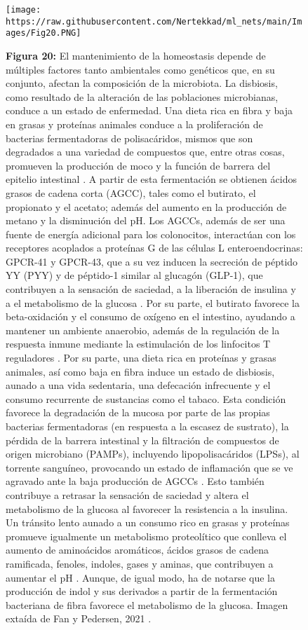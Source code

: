 \documentclass[
]{book}
\begin{document}
\begin{figure}
\centering
\texttt{[image: https://raw.githubusercontent.com/Nertekkad/ml\_nets/main/Images/Fig20.PNG]}
\caption{\textbf{Figura 20:} El mantenimiento de la homeostasis depende de múltiples factores tanto ambientales como genéticos que, en su conjunto, afectan la composición de la microbiota. La disbiosis, como resultado de la alteración de las poblaciones microbianas, conduce a un estado de enfermedad. Una dieta rica en fibra y baja en grasas y proteínas animales conduce a la proliferación de bacterias fermentadoras de polisacáridos, mismos que son degradados a una variedad de compuestos que, entre otras cosas, promueven la producción de moco y la función de barrera del epitelio intestinal \citep{fan2021gut}. A partir de esta fermentación se obtienen ácidos grasos de cadena corta (AGCC), tales como el butirato, el propionato y el acetato; además del aumento en la producción de metano y la disminución del pH. Los AGCCs, además de ser una fuente de energía adicional para los colonocitos, interactúan con los receptores acoplados a proteínas G de las células L enteroendocrinas: GPCR-41 y GPCR-43, que a su vez inducen la secreción de péptido YY (PYY) y de péptido-1 similar al glucagón (GLP-1), que contribuyen a la sensación de saciedad, a la liberación de insulina y a el metabolismo de la glucosa \citep{flint2000effect}. Por su parte, el butirato favorece la beta-oxidación y el consumo de oxígeno en el intestino, ayudando a mantener un ambiente anaerobio, además de la regulación de la respuesta inmune mediante la estimulación de los linfocitos T reguladores \citep{maslowski2009regulation}. Por su parte, una dieta rica en proteínas y grasas animales, así como baja en fibra induce un estado de disbiosis, aunado a una vida sedentaria, una defecación infrecuente y el consumo recurrente de sustancias como el tabaco. Esta condición favorece la degradación de la mucosa por parte de las propias bacterias fermentadoras (en respuesta a la escasez de sustrato), la pérdida de la barrera intestinal y la filtración de compuestos de origen microbiano (PAMPs), incluyendo lipopolisacáridos (LPSs), al torrente sanguíneo, provocando un estado de inflamación que se ve agravado ante la baja producción de AGCCs \citep{macfarlane2006composition}. Esto también contribuye a retrasar la sensación de saciedad y altera el metabolismo de la glucosa al favorecer la resistencia a la insulina. Un tránsito lento aunado a un consumo rico en grasas y proteínas promueve igualmente un metabolismo proteolítico que conlleva el aumento de aminoácidos aromáticos, ácidos grasos de cadena ramificada, fenoles, indoles, gases y aminas, que contribuyen a aumentar el pH \citep{russell2013major}. Aunque, de igual modo, ha de notarse que la producción de indol y sus derivados a partir de la fermentación bacteriana de fibra favorece el metabolismo de la glucosa. Imagen extaída de Fan y Pedersen, 2021 \citep{de2017indolepropionic}.}
\end{figure}
\end{document}
